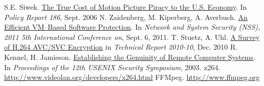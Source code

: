 \documentclass[conference]{IEEEtran}
\begin{document}
 
\begin{thebibliography}{99} 
     S.E. Siwek. \href{www.copyrightalliance.org/files/u227/CostOfPiracy.pdf}{The True Cost of Motion Picture Piracy to the U.S. Economy}. In {\it Policy Report 186}, Sept. 2006
     N. Zaidenberg, M. Kiperberg, A. Averbuch. \href{www.cs.tau.ac.il/~kiperber/truly.pdf}{An Efficient VM–Based Software Protection}. In {\it Network and System Security (NSS), 2011 5th International Conference on}, Sept. 6, 2011. 
     T. Stuetz, A. Uhl. \href{}{A Survey of H.264 AVC/SVC Encryption} in {\it Technical Report 2010-10}, Dec. 2010
     R. Kennel, H. Jamieson. \href{http://static.usenix.org/events/sec03/tech/kennell/kennell.pdf}{Establishing the Genuinity of Remote Computer Systems}. In {\it Proceedings of the 12th USENIX Security Symposium}, 2003.
     x264. \url{http://www.videolan.org/developers/x264.html}
     FFMpeg. \url{http://www.ffmpeg.org}

\end{thebibliography} 
\end{document}
